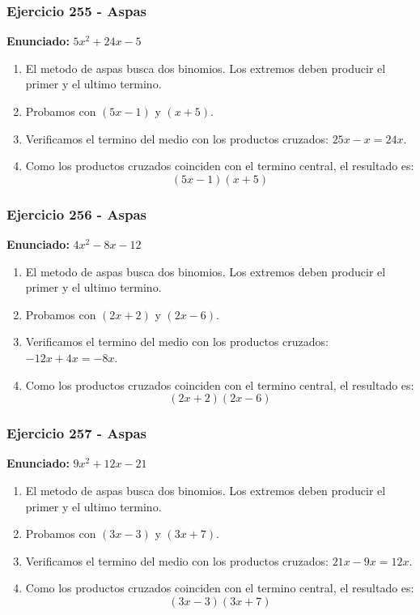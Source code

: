 \documentclass[11pt,a4paper]{article}
\begin{document}
\vspace{0.2cm}
\subsubsection*{Ejercicio 255 - Aspas}
\textbf{Enunciado:} $ 5 x^{2} + 24 x - 5 $\par
\begin{enumerate}[leftmargin=2em]
\item El metodo de aspas busca dos binomios. Los extremos deben producir el primer y el ultimo termino.
\item Probamos con \((5 x - 1)\) y \((x + 5)\).
\item Verificamos el termino del medio con los productos cruzados: \(25 x- x=24 x\).
\item Como los productos cruzados coinciden con el termino central, el resultado es: \[\boxed{\left(5 x - 1\right)\left(x + 5\right)}\]
\end{enumerate}

\vspace{0.2cm}
\subsubsection*{Ejercicio 256 - Aspas}
\textbf{Enunciado:} $ 4 x^{2} - 8 x - 12 $\par
\begin{enumerate}[leftmargin=2em]
\item El metodo de aspas busca dos binomios. Los extremos deben producir el primer y el ultimo termino.
\item Probamos con \((2 x + 2)\) y \((2 x - 6)\).
\item Verificamos el termino del medio con los productos cruzados: \(- 12 x+4 x=- 8 x\).
\item Como los productos cruzados coinciden con el termino central, el resultado es: \[\boxed{\left(2 x + 2\right)\left(2 x - 6\right)}\]
\end{enumerate}

\vspace{0.2cm}
\subsubsection*{Ejercicio 257 - Aspas}
\textbf{Enunciado:} $ 9 x^{2} + 12 x - 21 $\par
\begin{enumerate}[leftmargin=2em]
\item El metodo de aspas busca dos binomios. Los extremos deben producir el primer y el ultimo termino.
\item Probamos con \((3 x - 3)\) y \((3 x + 7)\).
\item Verificamos el termino del medio con los productos cruzados: \(21 x- 9 x=12 x\).
\item Como los productos cruzados coinciden con el termino central, el resultado es: \[\boxed{\left(3 x - 3\right)\left(3 x + 7\right)}\]
\end{enumerate}
\end{document}

